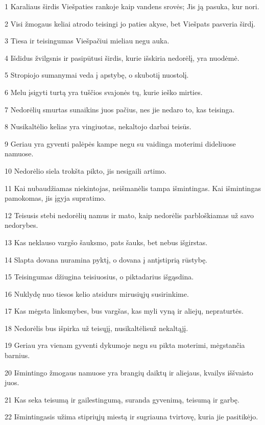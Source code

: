 \par 1 Karaliaus širdis Viešpaties rankoje kaip vandens srovės; Jis ją pasuka, kur nori. 
\par 2 Visi žmogaus keliai atrodo teisingi jo paties akyse, bet Viešpats pasveria širdį. 
\par 3 Tiesa ir teisingumas Viešpačiui mieliau negu auka. 
\par 4 Išdidus žvilgsnis ir pasipūtusi širdis, kurie išskiria nedorėlį, yra nuodėmė. 
\par 5 Stropiojo sumanymai veda į apstybę, o skuboti­į nuostolį. 
\par 6 Melu įsigyti turtą yra tuščios svajonės tų, kurie ieško mirties. 
\par 7 Nedorėlių smurtas sunaikins juos pačius, nes jie nedaro to, kas teisinga. 
\par 8 Nusikaltėlio kelias yra vingiuotas, nekaltojo darbai teisūs. 
\par 9 Geriau yra gyventi palėpės kampe negu su vaidinga moterimi dideliuose namuose. 
\par 10 Nedorėlio siela trokšta pikto, jis nesigaili artimo. 
\par 11 Kai nubaudžiamas niekintojas, neišmanėlis tampa išmintingas. Kai išmintingas pamokomas, jis įgyja supratimo. 
\par 12 Teisusis stebi nedorėlių namus ir mato, kaip nedorėlis parbloškiamas už savo nedorybes. 
\par 13 Kas neklauso vargšo šauksmo, pats šauks, bet nebus išgirstas. 
\par 14 Slapta dovana nuramina pyktį, o dovana į antį­stiprią rūstybę. 
\par 15 Teisingumas džiugina teisiuosius, o piktadarius išgąsdina. 
\par 16 Nuklydę nuo tiesos kelio atsidurs mirusiųjų susirinkime. 
\par 17 Kas mėgsta linksmybes, bus vargšas, kas myli vyną ir aliejų, nepraturtės. 
\par 18 Nedorėlis bus išpirka už teisųjį, nusikaltėlis­už nekaltąjį. 
\par 19 Geriau yra vienam gyventi dykumoje negu su pikta moterimi, mėgstančia barnius. 
\par 20 Išmintingo žmogaus namuose yra brangių daiktų ir aliejaus, kvailys iššvaisto juos. 
\par 21 Kas seka teisumą ir gailestingumą, suranda gyvenimą, teisumą ir garbę. 
\par 22 Išmintingasis užima stipriųjų miestą ir sugriauna tvirtovę, kuria jie pasitikėjo. 
